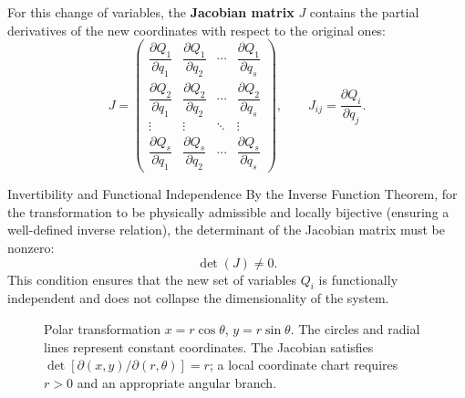 \documentclass[11pt,letterpaper]{article}
\newcommand{\term}[1]{\textbf{\color{tealmain}#1}}
\begin{document}
For this change of variables, the \term{Jacobian matrix} $J$ contains the partial derivatives of the new coordinates with respect to the original ones:
\begin{equation}
    J = \begin{pmatrix}
        \dfrac{\partial Q_1}{\partial q_1} & \dfrac{\partial Q_1}{\partial q_2} & \cdots & \dfrac{\partial Q_1}{\partial q_s} \\[1em]
        \dfrac{\partial Q_2}{\partial q_1} & \dfrac{\partial Q_2}{\partial q_2} & \cdots & \dfrac{\partial Q_2}{\partial q_s} \\[1em]
        \vdots & \vdots & \ddots & \vdots \\[0.5em]
        \dfrac{\partial Q_s}{\partial q_1} & \dfrac{\partial Q_s}{\partial q_2} & \cdots & \dfrac{\partial Q_s}{\partial q_s}
    \end{pmatrix}, \qquad J_{ij} = \frac{\partial Q_i}{\partial q_j}.
\end{equation}

\begin{teobox}{Invertibility and Functional Independence}
By the Inverse Function Theorem, for the transformation to be physically admissible and locally bijective (ensuring a well-defined inverse relation), the determinant of the Jacobian matrix must be nonzero:
\begin{equation}
    \det(J) \neq 0.
\end{equation}
This condition ensures that the new set of variables $Q_i$ is functionally independent and does not collapse the dimensionality of the system.
\end{teobox}


\begin{figure}[!htbp]
\centering
\caption{Polar transformation $x=r\cos\theta$, $y=r\sin\theta$. The circles and radial lines represent constant coordinates. The Jacobian satisfies $\det[\partial(x,y)/\partial(r,\theta)]=r$; a local coordinate chart requires $r>0$ and an appropriate angular branch.}
\label{fig:coordenadas_polares_python}
\end{figure}
\FloatBarrier
\end{document}
